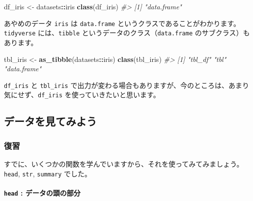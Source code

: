 \documentclass[
  xelatex, ja=standard]{bxjsbook}
\newenvironment{Shaded}{\begin{snugshade}}{\end{snugshade}}
\newcommand{\CommentTok}[1]{\textcolor[rgb]{0.56,0.35,0.01}{\textit{#1}}}
\newcommand{\FunctionTok}[1]{\textcolor[rgb]{0.13,0.29,0.53}{\textbf{#1}}}
\newcommand{\NormalTok}[1]{#1}
\newcommand{\OtherTok}[1]{\textcolor[rgb]{0.56,0.35,0.01}{#1}}
\newcommand{\SpecialCharTok}[1]{\textcolor[rgb]{0.81,0.36,0.00}{\textbf{#1}}}
\theoremstyle{definition}
\theoremstyle{definition}
\theoremstyle{definition}
\theoremstyle{definition}
\theoremstyle{remark}
\begin{document}
\begin{Shaded}
\begin{Highlighting}[]
\NormalTok{df\_iris }\OtherTok{\textless{}{-}}\NormalTok{ datasets}\SpecialCharTok{::}\NormalTok{iris }
\FunctionTok{class}\NormalTok{(df\_iris)}
\CommentTok{\#\textgreater{} [1] "data.frame"}
\end{Highlighting}
\end{Shaded}

あやめのデータ \texttt{iris} は \texttt{data.frame} というクラスであることがわかります。\texttt{tidyverse} には、\texttt{tibble} というデータのクラス（\texttt{data.frame} のサブクラス）もあります。

\begin{Shaded}
\begin{Highlighting}[]
\NormalTok{tbl\_iris }\OtherTok{\textless{}{-}} \FunctionTok{as\_tibble}\NormalTok{(datasets}\SpecialCharTok{::}\NormalTok{iris)}
\FunctionTok{class}\NormalTok{(tbl\_iris)}
\CommentTok{\#\textgreater{} [1] "tbl\_df"     "tbl"        "data.frame"}
\end{Highlighting}
\end{Shaded}

\texttt{df\_iris} と \texttt{tbl\_iris} で出力が変わる場合もありますが、今のところは、あまり気にせず、\texttt{df\_iris} を使っていきたいと思います。

\hypertarget{ux30c7ux30fcux30bfux3092ux898bux3066ux307fux3088ux3046}{%
\subsection{データを見てみよう}\label{ux30c7ux30fcux30bfux3092ux898bux3066ux307fux3088ux3046}}

\hypertarget{ux5fa9ux7fd2}{%
\subsubsection{復習}\label{ux5fa9ux7fd2}}

すでに、いくつかの関数を学んでいますから、それを使ってみてみましょう。\texttt{head}, \texttt{str}, \texttt{summary} でした。

\hypertarget{head-ux30c7ux30fcux30bfux306eux982dux306eux90e8ux5206}{%
\paragraph{\texorpdfstring{\texttt{head} : データの頭の部分}{head : データの頭の部分}}\label{head-ux30c7ux30fcux30bfux306eux982dux306eux90e8ux5206}}
\end{document}
